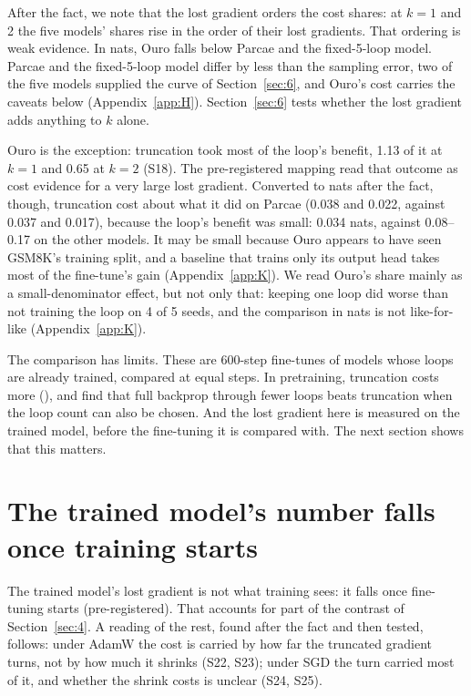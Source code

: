 \documentclass[10pt]{article}
\begin{document}
After the fact, we note that the lost gradient orders the cost shares: at $k = 1$ and 2 the five models' shares rise in the order of their lost gradients. That ordering is weak evidence. In nats, Ouro falls below Parcae and the fixed-5-loop model. Parcae and the fixed-5-loop model differ by less than the sampling error, two of the five models supplied the curve of Section~\ref{sec:6}, and Ouro's cost carries the caveats below (Appendix~\ref{app:H}). Section~\ref{sec:6} tests whether the lost gradient adds anything to $k$ alone.

Ouro is the exception: truncation took most of the loop's benefit, 1.13 of it at $k = 1$ and 0.65 at $k = 2$ (S18). The pre-registered mapping read that outcome as cost evidence for a very large lost gradient. Converted to nats after the fact, though, truncation cost about what it did on Parcae (0.038 and 0.022, against 0.037 and 0.017), because the loop's benefit was small: 0.034 nats, against 0.08--0.17 on the other models. It may be small because Ouro appears to have seen GSM8K's training split, and a baseline that trains only its output head takes most of the fine-tune's gain (Appendix~\ref{app:K}). We read Ouro's share mainly as a small-denominator effect, but not only that: keeping one loop did worse than not training the loop on 4 of 5 seeds, and the comparison in nats is not like-for-like (Appendix~\ref{app:K}).

The comparison has limits. These are 600-step fine-tunes of models whose loops are already trained, compared at equal steps. In pretraining, truncation costs more (\citealp{huang2026partii}), and \citet[Sec.~5.2]{xiong2026truncate} find that full backprop through fewer loops beats truncation when the loop count can also be chosen. And the lost gradient here is measured on the trained model, before the fine-tuning it is compared with. The next section shows that this matters.

\section{The trained model's number falls once training starts}\label{sec:5}

The trained model's lost gradient is not what training sees: it falls once fine-tuning starts (pre-registered). That accounts for part of the contrast of Section~\ref{sec:4}. A reading of the rest, found after the fact and then tested, follows: under AdamW the cost is carried by how far the truncated gradient turns, not by how much it shrinks (S22, S23); under SGD the turn carried most of it, and whether the shrink costs is unclear (S24, S25).
\end{document}
